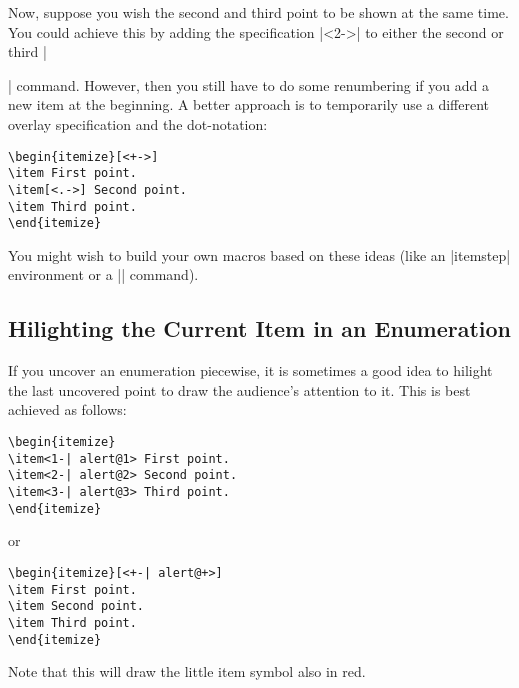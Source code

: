 Now, suppose you wish the second and third point to be shown at the
same time. You could achieve this by adding the specification |<2->|
to either the second or third |\item| command. However, then you still
have to do some renumbering if you add a new item at the beginning. A
better approach is to temporarily use a different overlay
specification and the dot-notation:

\begin{verbatim}
\begin{itemize}[<+->]
\item First point.
\item[<.->] Second point.
\item Third point.
\end{itemize}
\end{verbatim}

You might wish to build your own macros based on these ideas (like an
|itemstep| environment or a |\itemlikeprevious| command).



\subsection{Hilighting the Current Item in an Enumeration}

If you uncover an enumeration piecewise, it is sometimes a good idea
to hilight the last uncovered point to draw the audience's attention
to it. This is best achieved as follows:


\begin{verbatim}
\begin{itemize}
\item<1-| alert@1> First point.
\item<2-| alert@2> Second point.
\item<3-| alert@3> Third point.
\end{itemize}
\end{verbatim}

or

\begin{verbatim}
\begin{itemize}[<+-| alert@+>]
\item First point.
\item Second point.
\item Third point.
\end{itemize}
\end{verbatim}

Note that this will draw the little item symbol also in red.



